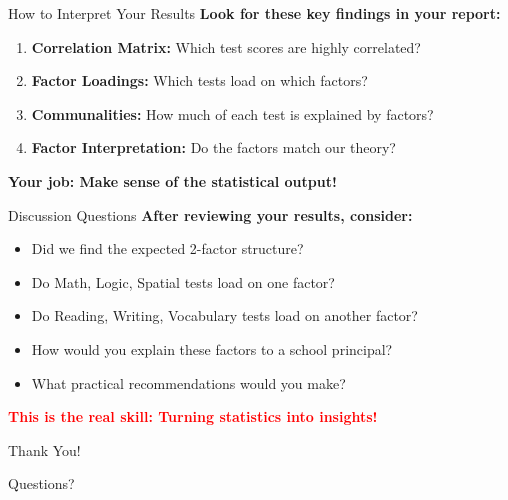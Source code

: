 \documentclass[aspectratio=169]{beamer}
\begin{document}
\begin{frame}{How to Interpret Your Results}
  \textbf{Look for these key findings in your report:}
  
  \begin{enumerate}
    \item \textbf{Correlation Matrix:} Which test scores are highly correlated?
    \pause
    \item \textbf{Factor Loadings:} Which tests load on which factors?
    \pause
    \item \textbf{Communalities:} How much of each test is explained by factors?
    \pause
    \item \textbf{Factor Interpretation:} Do the factors match our theory?
  \end{enumerate}
  
  \pause
  
  \begin{center}
    \textbf{Your job: Make sense of the statistical output!}
  \end{center}
\end{frame}

\begin{frame}{Discussion Questions}
  \textbf{After reviewing your results, consider:}
  
  \begin{itemize}
    \item Did we find the expected 2-factor structure?
    \pause
    \item Do Math, Logic, Spatial tests load on one factor?
    \pause
    \item Do Reading, Writing, Vocabulary tests load on another factor?
    \pause
    \item How would you explain these factors to a school principal?
    \pause
    \item What practical recommendations would you make?
  \end{itemize}
  
  \pause
  
  \begin{center}
    \textcolor{red}{\textbf{This is the real skill: Turning statistics into insights!}}
  \end{center}
\end{frame}

\begin{frame}
  \centering
  \Huge Thank You!
  
  \normalsize Questions?
\end{frame}
\end{document}
